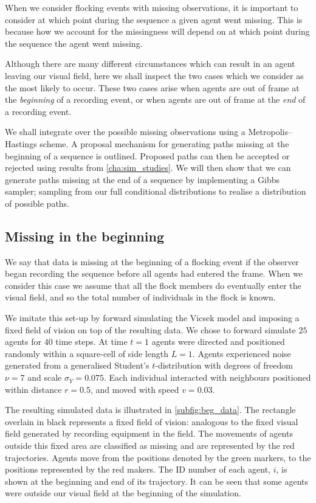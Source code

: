 When we consider flocking events with missing observations, it is important to
consider at which point during the sequence a given agent went missing. This is
because how we account for the missingness will depend on at which point during
the sequence the agent went missing.

Although there are many different circumstances which can result in an agent
leaving our visual field, here we shall inspect the two cases which we
consider as the most likely to occur. These two cases arise when agents are
out of frame at the \emph{beginning} of a recording event, or when
agents are out of frame at the \emph{end} of a recording event.

We shall integrate over the possible missing observations using a
Metropolis--Hastings scheme. A proposal mechanism for generating paths missing
at the beginning of a sequence is outlined. Proposed paths can then be accepted
or rejected using results from \cref{cha:sim_studies}. We will then show that
we can generate paths missing at the end of a sequence by implementing a Gibbs
sampler; sampling from our full conditional distributions to realise a
distribution of possible paths.

\subsection{Missing in the beginning}
\label{subsec:beg_missing}

We say that data is missing at the beginning of a flocking event if the
observer began recording the sequence before all agents had entered the frame.
When we consider this case we assume that all the flock members do eventually
enter the visual field, and so the total number of individuals in the flock is
known.

We imitate this set-up by forward simulating the Vicsek model and imposing a
fixed field of vision on top of the resulting data. We chose to forward
simulate $25$ agents for $40$ time steps. At time $t=1$ agents were directed
and positioned randomly within a square-cell of side length $L=1$. Agents
experienced noise generated from a generalised Student's $t$-distribution with
degrees of freedom $\nu=7$ and scale $\sigma_Y=0.075$. Each individual
interacted with neighbours positioned within distance $r=0.5$, and moved with
speed $v=0.03$.

The resulting simulated data is illustrated in \cref{subfig:beg_data}. The
rectangle overlain in black represents a fixed field of vision: analogous to
the fixed visual field generated by recording equipment in the field. The
movements of agents outside this fixed area are classified as missing and are
represented by the red trajectories. Agents move from the positions denoted by
the green markers, to the positions represented by the red makers. The ID
number of each agent, $i$, is shown at the beginning and end of its trajectory.
It can be seen that some agents were outside our visual field at the beginning
of the simulation. 

